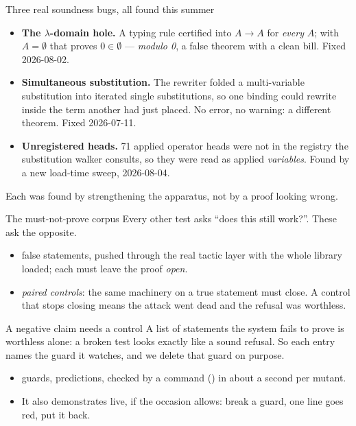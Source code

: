 \documentclass[11pt,aspectratio=169]{beamer}
\begin{document}
\begin{frame}{Three real soundness bugs, all found this summer}
  \begin{itemize}
    \item \textbf{The $\lambda$-domain hole.} A typing rule certified
           into $A \to A$ for \emph{every} $A$; with
          $A = \emptyset$ that proves $0 \in \emptyset$ --- \emph{modulo 0}, a
          false theorem with a clean bill. Fixed 2026-08-02.
    \item \textbf{Simultaneous substitution.} The rewriter folded a
          multi-variable substitution into iterated single substitutions, so
          one binding could rewrite inside the term another had just placed. No
          error, no warning: a different theorem. Fixed 2026-07-11.
    \item \textbf{Unregistered heads.} 71 applied operator heads were not in
          the registry the substitution walker consults, so they were read as
          applied \emph{variables}. Found by a new load-time sweep, 2026-08-04.
  \end{itemize}
  \vfill
  \small Each was found by strengthening the apparatus, not by a proof looking
  wrong.
\end{frame}

\begin{frame}[fragile]{The must-not-prove corpus}
  Every other test asks ``does this still work?''. These ask the opposite.
  \begin{itemize}\small
    \item \Nmnp{} false statements, pushed through the real tactic layer with
          the whole library loaded; each must leave the proof \emph{open}.
    \item \Nmnpctl{} \emph{paired controls}: the same machinery on a true
          statement must close. A control that stops closing means the attack
          went dead and the refusal was worthless.
  \end{itemize}
\end{frame}

\begin{frame}[fragile]{A negative claim needs a control}
  A list of statements the system fails to prove is worthless alone: a broken
  test looks exactly like a sound refusal. So each entry names the guard it
  watches, and we delete that guard on purpose.
  \begin{itemize}\small
    \item \Nmut{} guards, \Nmut{} predictions, checked by a command
          () in about a second per mutant.
    \item It also demonstrates live, if the occasion allows: break a guard, one
          line goes red, put it back.
  \end{itemize}
\end{frame}
\end{document}
